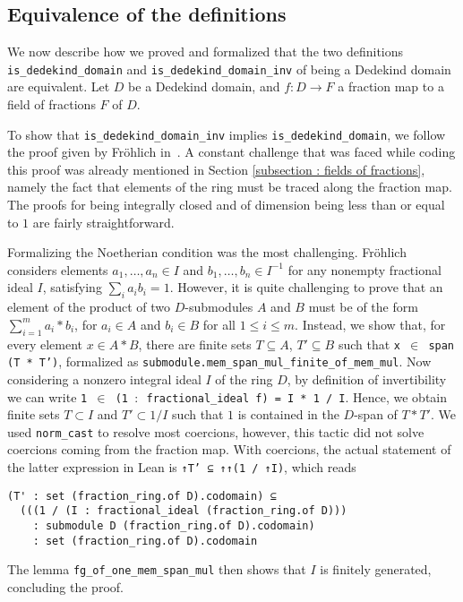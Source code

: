 \documentclass[a4paper,USenglish,cleveref, autoref, thm-restate]{lipics-v2021}
\newcommand{\lean}[1]{\texttt{#1}\xspace} %
\begin{document}
\subsection{Equivalence of the definitions} \label{sec:equivalence}
We now describe how we proved and formalized that the two definitions \lean{is\_dedekind\_domain} and \lean{is\_dedekind\_domain\_inv} of being a Dedekind domain are equivalent. Let $D$ be a Dedekind domain, and $f\colon D\to F$ a fraction map to a field of fractions $F$ of $D$.

To show that \lean{is\_dedekind\_domain\_inv} implies \lean{is\_dedekind\_domain}, we follow the proof given by Fr\"ohlich in~\cite[Chapter 1, \S~2, ~Proposition 1.2.1]{frohlich}. A constant challenge that was faced while coding this proof was already mentioned in Section \ref{subsection : fields of fractions}, namely the fact that elements of the ring must be traced along the fraction map. %
The proofs for being integrally closed and of dimension being less than or equal to $1$ are fairly straightforward.

Formalizing the Noetherian condition was the most challenging. Fr\"ohlich considers elements $a_1, \dots, a_n \in I$ and $b_1, \dots, b_n \in I^{-1}$ for any nonempty fractional ideal $I$,
satisfying $ \sum_i a_i b_i = 1 $.
However, it is quite challenging to prove that an element of the product of two $D$-submodules $A$ and $B$ must be of the form $\sum_{i = 1}^m a_i*b_i$, for $a_i \in A$ and $b_i \in B$ for all $1 \leq i \leq m$.
Instead, we show that, for every element $x\in A\ast B$, there are finite sets $T\subseteq A$, $T'\subseteq B$ such that \lean{x $\in$ span (T * T')}, formalized as %
\lean{submodule.mem\_span\_mul\_finite\_of\_mem\_mul}.
Now considering a nonzero integral ideal $I$ of the ring $D$, by definition of invertibility we can write \lean{1 $\in$ (1 $:$ fractional\_ideal f) = I * 1 / I}. Hence, we obtain 
finite sets $T \subset I$ and $T' \subset 1/I$ such that $1$ is contained in the $D$-span of $T*T'$. We used \lean{norm\_cast} to resolve most coercions, however, this tactic did not solve coercions coming from the fraction map. With coercions, the actual statement of the latter expression in Lean is \lean{↑T' ⊆ ↑↑(1 / ↑I)}, which reads
\begin{lstlisting}
(T' : set (fraction_ring.of D).codomain) ⊆
  (((1 / (I : fractional_ideal (fraction_ring.of D)))
    : submodule D (fraction_ring.of D).codomain)
    : set (fraction_ring.of D).codomain
\end{lstlisting}
The lemma \lean{fg\_of\_one\_mem\_span\_mul} then shows that $I$ is finitely generated, concluding the proof.
\end{document}
